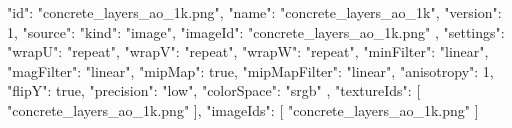 {
  "id": "concrete_layers_ao_1k.png",
  "name": "concrete_layers_ao_1k",
  "version": 1,
  "source": {
    "kind": "image",
    "imageId": "concrete_layers_ao_1k.png"
  },
  "settings": {
    "wrapU": "repeat",
    "wrapV": "repeat",
    "wrapW": "repeat",
    "minFilter": "linear",
    "magFilter": "linear",
    "mipMap": true,
    "mipMapFilter": "linear",
    "anisotropy": 1,
    "flipY": true,
    "precision": "low",
    "colorSpace": "srgb"
  },
  "textureIds": [
    "concrete_layers_ao_1k.png"
  ],
  "imageIds": [
    "concrete_layers_ao_1k.png"
  ]
}
